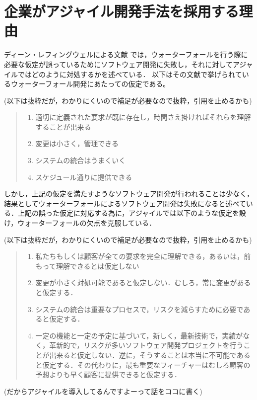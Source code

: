 \section{企業がアジャイル開発手法を採用する理由}

ディーン・レフィングウェルによる文献 \cite{leffingwell2010アジャイル開発の本質とスケールアップ}では，ウォーターフォールを行う際に必要な仮定が誤っているためにソフトウェア開発に失敗し，それに対してアジャイルではどのように対処するかを述べている．
以下はその文献で挙げられているウォーターフォール開発にあたっての仮定である。

(以下は抜粋だが，わかりにくいので補足が必要なので抜粋，引用を止めるかも)

\begin{quote}
  \begin{enumerate}
    \item 適切に定義された要求が既に存在し，時間さえ掛ければそれらを理解することが出来る
    \item 変更は小さく，管理できる
    \item システムの統合はうまくいく
    \item スケジュール通りに提供できる
  \end{enumerate}
\end{quote}

しかし，上記の仮定を満たすようなソフトウェア開発が行われることは少なく，結果としてウォーターフォールによるソフトウェア開発は失敗になると述べている．上記の誤った仮定に対応する為に，アジャイルでは以下のような仮定を設け，ウォーターフォールの欠点を克服している．

(以下は抜粋だが，わかりにくいので補足が必要なので抜粋，引用を止めるかも)

\begin{quote}
  \begin{enumerate}
    \item 私たちもしくは顧客が全ての要求を完全に理解できる，あるいは，前もって理解できるとは仮定しない
    \item 変更が小さく対処可能であると仮定しない．むしろ，常に変更があると仮定する．
    \item システムの統合は重要なプロセスで，リスクを減らすために必要であると仮定する．
    \item 一定の機能と一定の予定に基づいて，新しく，最新技術で，実績がなく，革新的で，リスクが多いソフトウェア開発プロジェクトを行うことが出来ると仮定しない．逆に，そうすることは本当に不可能であると仮定する．その代わりに，最も重要なフィーチャーはむしろ顧客の予想よりも早く顧客に提供できると仮定する．
  \end{enumerate}
\end{quote}

(だからアジャイルを導入してるんですよーって話をココに書く)

